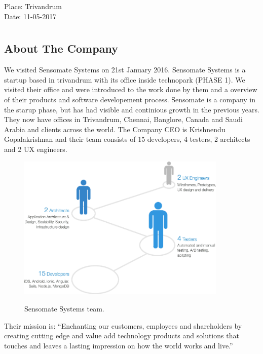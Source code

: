 \documentclass[a4paper,12pt]{report}
\begin{document}
\begin{titlepage}
		\begin{flushleft}
		Place: Trivandrum\\
		Date:  11-05-2017\\
		\end{flushleft}
		\vfill %
	\end{titlepage}

	
	\newpage
	\tableofcontents
	\newpage

	\chapter*{}
	\newpage
		\section{About The Company}
		We visited Sensomate Systems on 21st January 2016. Sensomate Systems is a startup based in trivandrum with its office inside technopark (PHASE 1). We visited their office and were introduced to the work done by them and a overview of their products and software developement process. Sensomate is a company in the starup phase, but has had visible and continious growth in the previous years. They now have offices in Trivandrum, Chennai, Banglore, Canada and Saudi Arabia and clients across the world. The Company CEO is Krishnendu Gopalakrishnan and their team consists of 15 developers, 4 testers, 2 architects and 2 UX engineers.  
		\begin{figure}[H]
			\begin{centering}
				\includegraphics[width=10cm]{images/team.png}\\
				\caption{Sensomate Systems team.}
			\end{centering}
		\end{figure}
		Their mission is: ``Enchanting our customers, employees and shareholders by creating cutting edge and value add technology products and solutions that touches and leaves a lasting impression on how the world works and live.''
\end{document}
